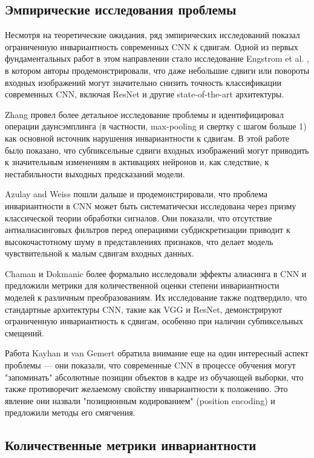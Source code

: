 \subsection{Эмпирические исследования проблемы}
\label{review:invariance:empirical}

Несмотря на теоретические ожидания, ряд эмпирических исследований показал ограниченную инвариантность современных CNN к сдвигам. Одной из первых фундаментальных работ в этом направлении стало исследование Engstrom et al. \cite{Engstrom2019}, в котором авторы продемонстрировали, что даже небольшие сдвиги или повороты входных изображений могут значительно снизить точность классификации современных CNN, включая ResNet и другие state-of-the-art архитектуры.

Zhang \cite{Zhang2019} провел более детальное исследование проблемы и идентифицировал операции даунсэмплинга (в частности, max-pooling и свертку с шагом больше 1) как основной источник нарушения инвариантности к сдвигам. В этой работе было показано, что субпиксельные сдвиги входных изображений могут приводить к значительным изменениям в активациях нейронов и, как следствие, к нестабильности выходных предсказаний модели.

Azulay and Weiss \cite{Azulay2018} пошли дальше и продемонстрировали, что проблема инвариантности в CNN может быть систематически исследована через призму классической теории обработки сигналов. Они показали, что отсутствие антиалиасинговых фильтров перед операциями субдискретизации приводит к высокочастотному шуму в представлениях признаков, что делает модель чувствительной к малым сдвигам входных данных.

Chaman и Dokmanic \cite{Chaman2021} более формально исследовали эффекты алиасинга в CNN и предложили метрики для количественной оценки степени инвариантности моделей к различным преобразованиям. Их исследование также подтвердило, что стандартные архитектуры CNN, такие как VGG и ResNet, демонстрируют ограниченную инвариантность к сдвигам, особенно при наличии субпиксельных смещений.

Работа Kayhan и van Gemert \cite{Kayhan2020} обратила внимание еще на один интересный аспект проблемы — они показали, что современные CNN в процессе обучения могут "запоминать" абсолютные позиции объектов в кадре из обучающей выборки, что также противоречит желаемому свойству инвариантности к положению. Это явление они назвали "позиционным кодированием" (position encoding) и предложили методы его смягчения.

\subsection{Количественные метрики инвариантности}
\label{review:invariance:metrics}

